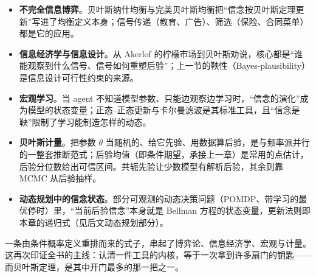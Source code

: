 \begin{itemize}
    \item \textbf{不完全信息博弈}。贝叶斯纳什均衡与完美贝叶斯均衡把``信念按贝叶斯定理更新''写进了均衡定义本身；信号传递（教育、广告）、筛选（保险、合同菜单）都是它的应用。
    \item \textbf{信息经济学与信息设计}。从 Akerlof 的柠檬市场到贝叶斯劝说，核心都是``谁能观察到什么信号、信号如何重塑后验''；上一节的鞅性（Bayes-plausibility）是信息设计可行性约束的来源。
    \item \textbf{宏观学习}。当 agent 不知道模型参数、只能边观察边学习时，``信念的演化''成为模型的状态变量；正态--正态更新与卡尔曼滤波是其标准工具，且``信念是鞅''限制了学习能制造怎样的动态。
    \item \textbf{贝叶斯计量}。把参数 $\theta$ 当随机的、给它先验、用数据算后验，是与频率派并行的一整套推断范式；后验均值（即条件期望，承接上一章）是常用的点估计，后验分位数给出可信区间。共轭先验让少数模型有解析后验，其余则靠 MCMC 从后验抽样。
    \item \textbf{动态规划中的信念状态}。部分可观测的动态决策问题（POMDP、带学习的最优停时）里，``当前后验信念''本身就是 Bellman 方程的状态变量，更新法则即本章的递归式（见后文动态规划部分）。
\end{itemize}

一条由条件概率定义重排而来的式子，串起了博弈论、信息经济学、宏观与计量。这再次印证全书的主线：认清一件工具的内核，等于一次拿到许多扇门的钥匙——而贝叶斯定理，是其中开门最多的那一把之一。
